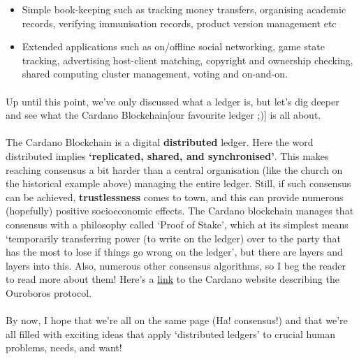 \documentclass[a4paper, 11pt]{article}
\begin{document}
\begin{description}
        \begin{itemize}
            \item Simple book-keeping such as tracking money transfers, organising academic records, verifying immunisation records, product version management etc 
            \item Extended applications such as on/offline social networking, game state tracking, advertising host-client matching, copyright and ownership checking, shared computing cluster management, voting and on-and-on.
        \end{itemize}

        \paragraph{}Up until this point, we've only discussed what a ledger is, but let's dig deeper and see what the Cardano Blockchain[our favourite ledger ;)] is all about. 

        \paragraph{}The Cardano Blockchain is a digital \textbf{distributed} ledger. Here the word distributed implies \textbf{`replicated, shared, and synchronised'}. This makes reaching consensus a bit harder than a central organisation (like the church on the historical example above) managing the entire ledger. Still, if such consensus can be achieved, \textbf{trustlessness} comes to town, and this can provide numerous (hopefully) positive socioeconomic effects. The Cardano blockchain manages that consensus with a philosophy called `Proof of Stake', which at its simplest means `temporarily transferring power (to write on the ledger) over to the party that has the most to lose if things go wrong on the ledger', but there are layers and layers into this. Also, numerous other consensus algorithms, so I beg the reader to read more about them! Here's a \href{https://cardano.org/ouroboros/}{link} to the Cardano website describing the Ouroboros protocol.

        \paragraph{}By now, I hope that we're all on the same page (Ha! consensus!) and that we're all filled with exciting ideas that apply `distributed ledgers' to crucial human problems, needs, and want! 
        


\end{description}
\end{document}
